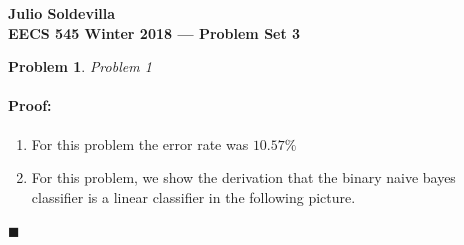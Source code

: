 \documentclass[12pt]{article}
\newenvironment{proof}{\paragraph{Proof: }}{\hfill$\blacksquare$}
\newtheorem{problem}{Problem}%
\begin{document}
\begin{center}
{\bf Julio Soldevilla}
\\
{\bf EECS 545 Winter 2018 --- Problem Set 3 }
\end{center}

\begin{problem}
\normalfont
Problem 1
\end{problem}

\begin{proof}

\begin{enumerate}

\item For this problem the error rate was $10.57 \%$

\item For this problem, we show the derivation that the binary naive bayes classifier is a linear classifier in the following picture.


\end{enumerate}
\end{proof}
\end{document}
